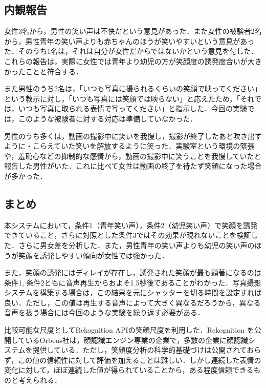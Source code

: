 \documentclass[submit,techreq]{ec2014}
\begin{document}
\subsection{内観報告}

女性3名から，男性の笑い声は不快だという意見があった．また女性の被験者2名から，男性青年の笑い声よりも赤ちゃんのほうが笑いやすいという意見があった．そのうち1名は，それは自分が女性だからではないかという意見を付した．これらの報告は，実際に女性では青年より幼児の方が笑顔度の誘発度合いが大きかったことと符合する．

また男性のうち2名は，「いつも写真に撮られるくらいの笑顔で映ってください」という教示に対し，「いつも写真には笑顔では映らない」と応えたため，「それでは，いつも写真に取られる表情で写ってください」と指示した．今回の実験では，このような被験者に対する対応は準備していなかった．

男性のうち多くは，動画の撮影中に笑いを我慢し，撮影が終了したあと吹き出すように・こらえていた笑いを解放するように笑った．実験室という環境の緊張や，羞恥心などの抑制的な感情から，動画の撮影中に笑うことを我慢していたと報告した男性がいた．これに比べて女性は動画の終了を待たず笑顔になった場合が多かった．

\subsection{まとめ}

本システムにおいて，条件1（青年笑い声），条件2（幼児笑い声）で笑顔を誘発できていること，さらに対照とした条件3ではその効果が現れないことを検証した．さらに男女差を分析した．また，男性青年の笑い声よりも幼児の笑い声のほうが笑顔を誘発しやすい傾向が女性では強かった．

また，笑顔の誘発にはディレイが存在し，誘発された笑顔が最も顕著になるのは条件1, 条件2ともに音声再生からおよそ1.5秒後であることがわかった．写真撮影システムを構築する場合は，この結果を元にシャッターを切る時間を設定すれば良い．ただし，この値は再生する音声によって大きく異なるだろうから，異なる音声を扱う場合には今回のような実験を繰り返す必要がある．

比較可能な尺度としてRekognition APIの笑顔尺度を利用した．Rekognition を公開しているOrbeus社は，顔認識エンジン専業の企業で，多数の企業に顔認識システムを提供している．ただし，笑顔度分析の科学的基礎づけは公開されておらず，この値の信頼性に対して評価を加えることは難しい．しかし連続した表情の変化に対して，ほぼ連続した値が得られていることから，ある程度信頼できるものと考えられる．
\end{document}
